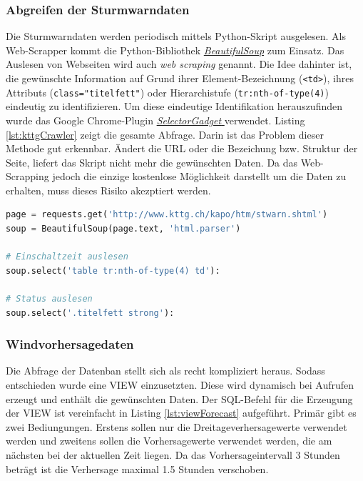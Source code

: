 \subsubsection{Abgreifen der Sturmwarndaten} %
Die Sturmwarndaten werden periodisch mittels Python-Skript ausgelesen. Als Web-Scrapper kommt die Python-Bibliothek \href{https://www.crummy.com/software/BeautifulSoup/}{\emph{BeautifulSoup}} zum Einsatz. Das Auslesen von Webseiten wird auch \emph{web scraping} genannt. Die Idee dahinter ist, die gewünschte Information auf Grund ihrer Element-Bezeichnung (\texttt{<td>}), ihres Attributs (\texttt{class="titelfett"}) oder Hierarchistufe (\texttt{tr:nth-of-type(4)}) eindeutig zu identifizieren. Um diese eindeutige Identifikation herauszufinden wurde das Google Chrome-Plugin \href{https://selectorgadget.com/}{\emph{SelectorGadget }} verwendet. Listing \ref{lst:kttgCrawler} zeigt die gesamte Abfrage. Darin ist das Problem dieser Methode gut erkennbar. Ändert die URL oder die Bezeichung bzw. Struktur der Seite, liefert das Skript nicht mehr die gewünschten Daten. Da das Web-Scrapping jedoch die einzige kostenlose Möglichkeit darstellt um die Daten zu erhalten, muss dieses Risiko akezptiert werden.


\begin{lstlisting}[label=lst:kttgCrawler,caption=Web-Scrapper für die Sturmwarndaten, language=python, style=py]
page = requests.get('http://www.kttg.ch/kapo/htm/stwarn.shtml')
soup = BeautifulSoup(page.text, 'html.parser')

# Einschaltzeit auslesen
soup.select('table tr:nth-of-type(4) td'):

# Status auslesen
soup.select('.titelfett strong'):
\end{lstlisting}


\subsubsection{Windvorhersagedaten}
Die Abfrage der Datenban stellt sich als recht kompliziert heraus. Sodass entschieden wurde eine VIEW einzusetzten. Diese wird dynamisch bei Aufrufen erzeugt und enthält die gewünschten Daten. Der SQL-Befehl für die Erzeugung der VIEW ist vereinfacht in Listing \ref{lst:viewForecast} aufgeführt. Primär gibt es zwei Bediungungen. Erstens sollen nur die Dreitageverhersagewerte verwendet werden und zweitens sollen die Vorhersagewerte verwendet werden, die am nächsten bei der aktuellen Zeit liegen. Da das Vorhersageintervall 3 Stunden beträgt ist die Verhersage maximal 1.5 Stunden verschoben.

